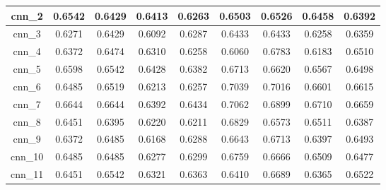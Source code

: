 \begin{table}[p]
\begin{tabular}{|c|c|c|c|c|c|c|c|c|}
        cnn\_2   & 0.6542                        & 0.6429                         & 0.6413                      & 0.6263                  & 0.6503 & 0.6526 & 0.6458 & 0.6392 \\ \hline
        cnn\_3   & 0.6271                        & 0.6429                         & 0.6092                      & 0.6287                  & 0.6433 & 0.6433 & 0.6258 & 0.6359 \\ \hline
        cnn\_4   & 0.6372                        & 0.6474                         & 0.6310                      & 0.6258                  & 0.6060 & 0.6783 & 0.6183 & 0.6510 \\ \hline
        cnn\_5   & 0.6598                        & 0.6542                         & 0.6428                      & 0.6382                  & 0.6713 & 0.6620 & 0.6567 & 0.6498 \\ \hline
        cnn\_6   & 0.6485                        & 0.6519                         & 0.6213                      & 0.6257                  & 0.7039 & 0.7016 & 0.6601 & 0.6615 \\ \hline
        cnn\_7   & 0.6644                        & 0.6644                         & 0.6392                      & 0.6434                  & 0.7062 & 0.6899 & 0.6710 & 0.6659 \\ \hline
        cnn\_8   & 0.6451                        & 0.6395                         & 0.6220                      & 0.6211                  & 0.6829 & 0.6573 & 0.6511 & 0.6387 \\ \hline
        cnn\_9   & 0.6372                        & 0.6485                         & 0.6168                      & 0.6288                  & 0.6643 & 0.6713 & 0.6397 & 0.6493 \\ \hline
        cnn\_10  & 0.6485                        & 0.6485                         & 0.6277                      & 0.6299                  & 0.6759 & 0.6666 & 0.6509 & 0.6477 \\ \hline
        cnn\_11  & 0.6451                        & 0.6542                         & 0.6321                      & 0.6363                  & 0.6410 & 0.6689 & 0.6365 & 0.6522 \\ \hline
    \end{tabular}
\end{table}


